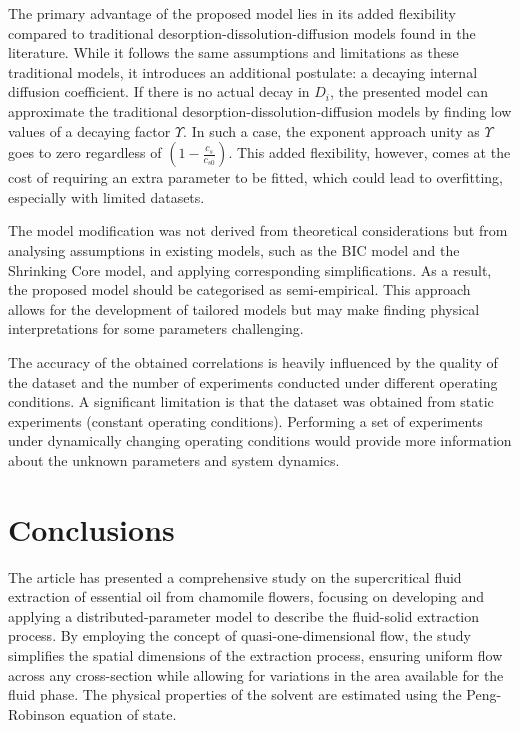 \documentclass[a4paper,fleqn]{cas-dc}
\begin{document}
The primary advantage of the proposed model lies in its added flexibility compared to traditional desorption-dissolution-diffusion models found in the literature. While it follows the same assumptions and limitations as these traditional models, it introduces an additional postulate: a decaying internal diffusion coefficient. If there is no actual decay in $D_i$, the presented model can approximate the traditional desorption-dissolution-diffusion models by finding low values of a decaying factor $\Upsilon$. In such a case, the exponent approach unity as $\Upsilon$ goes to zero regardless of $\left( 1 - \frac{c_s}{c_{s0}} \right)$. This added flexibility, however, comes at the cost of requiring an extra parameter to be fitted, which could lead to overfitting, especially with limited datasets.
	
The model modification was not derived from theoretical considerations but from analysing assumptions in existing models, such as the BIC model and the Shrinking Core model, and applying corresponding simplifications. As a result, the proposed model should be categorised as semi-empirical. This approach allows for the development of tailored models but may make finding physical interpretations for some parameters challenging.
	
The accuracy of the obtained correlations is heavily influenced by the quality of the dataset and the number of experiments conducted under different operating conditions. A significant limitation is that the dataset was obtained from static experiments (constant operating conditions). Performing a set of experiments under dynamically changing operating conditions would provide more information about the unknown parameters and system dynamics.

\section{Conclusions} \label{CH: Conclusion}

The article has presented a comprehensive study on the supercritical fluid extraction of essential oil from chamomile flowers, focusing on developing and applying a distributed-parameter model to describe the fluid-solid extraction process. By employing the concept of quasi-one-dimensional flow, the study simplifies the spatial dimensions of the extraction process, ensuring uniform flow across any cross-section while allowing for variations in the area available for the fluid phase. The physical properties of the solvent are estimated using the Peng-Robinson equation of state.
\end{document}
